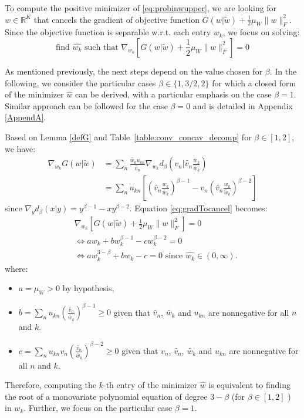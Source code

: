 \documentclass[a4paper, 11pt]{article}
\begin{document}
To compute the positive minimizer of \eqref{eq:probinwupper}, we are looking for $w \in \mathbb{R}^{K}$ that cancels the gradient of objective function $G(w|\tilde{w}) + \frac{1}{2} \mu_W \|w\|_F^2$. Since the objective function is separable w.r.t. each entry $w_k$, we focus on solving:
\begin{equation}\label{eq:gradTocancel}
    \text{find } \hat{w_k} \text{ such that } \nabla_{w_k}\left[ G(w|\tilde{w}) + \frac{1}{2} \mu_W \|w\|_F^2 \right] = 0
\end{equation}

As mentioned previously, the next steps depend on the value chosen for $\beta$. In the following, we consider the particular cases $\beta \in \{1,3/2,2\}$ for which a closed form of the minimizer $\hat{w}$ can be derived, with a particular emphasis on the case $\beta = 1$.
Similar approach can be followed for the case $\beta =0 $ and is detailed in Appendix \ref{AppendA}.

Based on Lemma \ref{defG} and Table~\ref{table:conv_concav_decomp} for $\beta \in [1,2] $, we have:
\begin{equation}
    \begin{aligned}
        \nabla_{w_k}G(w|\tilde{w})& =\sum_n \frac{\tilde{w_{k}}u_{kn}}{\tilde{v_{n}}}  \nabla_{w_k} d_{\beta}(v_{n}|\tilde{v_{n}}\frac{w_{k}}{\tilde{w_{k}}})\\
        & = \sum_n u_{kn} \left[ \left( \tilde{v_{n}}\frac{w_{k}}{\tilde{w_{k}}} \right)^{\beta-1} - v_n \left( \tilde{v_{n}}\frac{w_{k}}{\tilde{w_{k}}} \right)^{\beta-2} \right]
    \end{aligned}
\end{equation}
since $\nabla_y d_{\beta}(x|y)=y^{\beta-1}-xy^{\beta-2}$. Equation \eqref{eq:gradTocancel} becomes:
\begin{equation}\label{eq:polybeta}
    \begin{aligned}
       & \nabla_{w_k}\left[ G(w|\tilde{w}) + \frac{1}{2} \mu_W \|w\|_F^2 \right] = 0\\
        & \Leftrightarrow a w_k + b w_k^{\beta-1} - c w_k^{\beta-2} = 0 \\
        & \Leftrightarrow a w_k^{3-\beta} + b w_k - c  = 0 \text{ since } \hat{w_k} \in (0,\infty).
    \end{aligned}
\end{equation}
where:
\begin{itemize}
    \item $a=\mu_W > 0$ by hypothesis,
    \item $b=\sum_n u_{kn} \left( \frac{\tilde{v_{n}}}{\tilde{w_{k}}} \right)^{\beta-1}  \geq 0$ given that $\tilde{v_{n}}$, $\tilde{w_{k}}$ and $u_{kn}$ are nonnegative for all $n$ and $k$.
    \item $c=\sum_n u_{kn} v_n \left( \frac{\tilde{v_{n}}}{\tilde{w_{k}}} \right)^{\beta-2} \geq 0$ given that $v_{n}$, $\tilde{v_{n}}$, $\tilde{w_{k}}$ and $u_{kn}$ are nonnegative for all $n$ and $k$.
\end{itemize}
Therefore, computing the $k$-th entry of the minimizer $\hat{w}$ is equivalent to finding the root of a monovariate polynomial equation of degree $3-\beta$ (for $\beta \in [1,2] $ ) in $w_k$. Further, we focus on the particular case $\beta=1$. 
\end{document}
